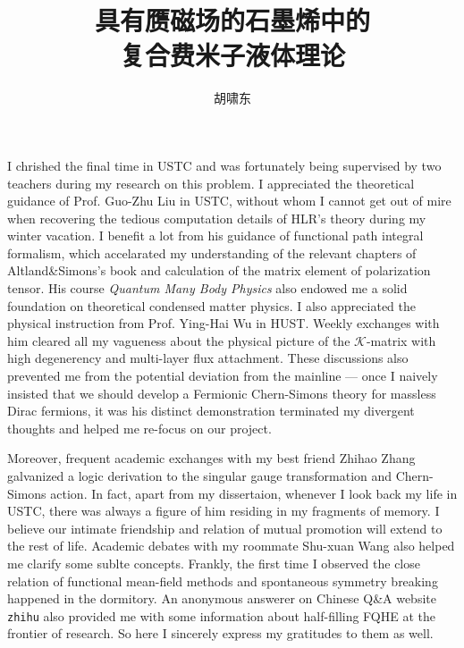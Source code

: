 \documentclass[bachelor,english,numbers]{ustcthesis}
\title{具有赝磁场的石墨烯中的\\复合费米子液体理论}
\author{胡啸东}
\begin{document}
\maketitle

%

\frontmatter

\begin{acknowledgements}
	I chrished the final time in USTC and was fortunately being supervised by two teachers during my research on this problem. I appreciated the theoretical guidance of Prof. Guo-Zhu Liu in USTC, without whom I cannot get out of mire when recovering the tedious computation details of HLR's theory during my winter vacation. I benefit a lot from his guidance of functional path integral formalism, which accelarated my understanding of the relevant chapters of Altland\&Simons's book and calculation of the matrix element of polarization tensor. His course \emph{Quantum Many Body Physics} also endowed me a solid foundation on theoretical condensed matter physics. I also appreciated the physical instruction from Prof. Ying-Hai Wu in HUST. Weekly exchanges with him cleared all my vagueness about the physical picture of the $\mathcal{K}$-matrix with high degenerency and multi-layer flux attachment. These discussions also prevented me from the potential deviation from the mainline --- once I naively insisted that we should develop a Fermionic Chern-Simons theory for massless Dirac fermions, it was his distinct demonstration terminated my divergent thoughts and helped me re-focus on our project.\par
	
	Moreover, frequent academic exchanges with my best friend Zhihao Zhang galvanized a logic derivation to the singular gauge transformation and Chern-Simons action. In fact, apart from my dissertaion, whenever I look back my life in USTC, there was always a figure of him residing in my fragments of memory. I believe our intimate friendship and relation of mutual promotion will extend to the rest of life. Academic debates with my roommate Shu-xuan Wang also helped me clarify some sublte concepts. Frankly, the first time I observed the close relation of functional mean-field methods and spontaneous symmetry breaking happened in the dormitory. An anonymous answerer on Chinese Q\&A website \texttt{zhihu} also provided me with some information about half-filling FQHE at the frontier of research. So here I sincerely express my gratitudes to them as well.
\end{acknowledgements}
\end{document}
